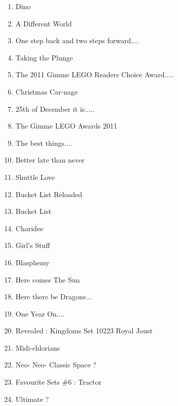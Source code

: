 \documentclass{article}
\begin{document}
\begin{enumerate}
\item Dino
\item A Different World
\item One step back and two steps forward....
\item Taking the Plunge
\item The 2011 Gimme LEGO Readers Choice Award.....
\item Christmas Car-nage
\item 25th of December it is.....
\item The Gimme LEGO Awards 2011
\item The best things....
\item Better late than never
\item Shuttle Love
\item Bucket List Reloaded
\item Bucket List
\item Charidee
\item Girl's Stuff
\item Blasphemy
\item Here comes The Sun
\item Here there be Dragons...
\item One Year On....
\item Revealed : Kingdoms Set 10223 Royal Joust
\item Midi-chlorians
\item Neo- Neo- Classic Space ?
\item Favourite Sets \#6 : Tractor
\item Ultimate ?
\end{enumerate}

\newpage



\end{document}
